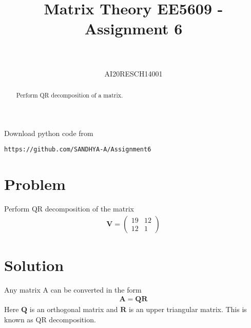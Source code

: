 \documentclass[journal,12pt,twocolumn]{IEEEtran}
\let\vec\mathbf
\numberwithin{equation}{subsection}
\newcommand{\myvec}[1]{\ensuremath{\begin{pmatrix}#1\end{pmatrix}}}
\begin{document}
\title{Matrix Theory EE5609 - Assignment 6\\
}

\author{\\
 \\
AI20RESCH14001\\
 }

\maketitle
\begin{abstract}
Perform QR decomposition of a matrix.
\end{abstract}
Download  python code from 
\begin{lstlisting}
https://github.com/SANDHYA-A/Assignment6
\end{lstlisting}
\section{Problem}
Perform QR decomposition of the matrix
\begin{align}
    \vec{V} = \myvec{19 & 12 \\12 & 1} \label{1.1}
\end{align}
\section{Solution}
Any matrix A can be converted in the form 
\begin{align}
    \vec{A} = \vec{Q}\vec{R}\label{2.1}
\end{align}
Here  $\vec{Q}$ is an orthogonal matrix and $\vec{R}$ is an upper triangular matrix. This is known as QR decomposition.
\end{document}
